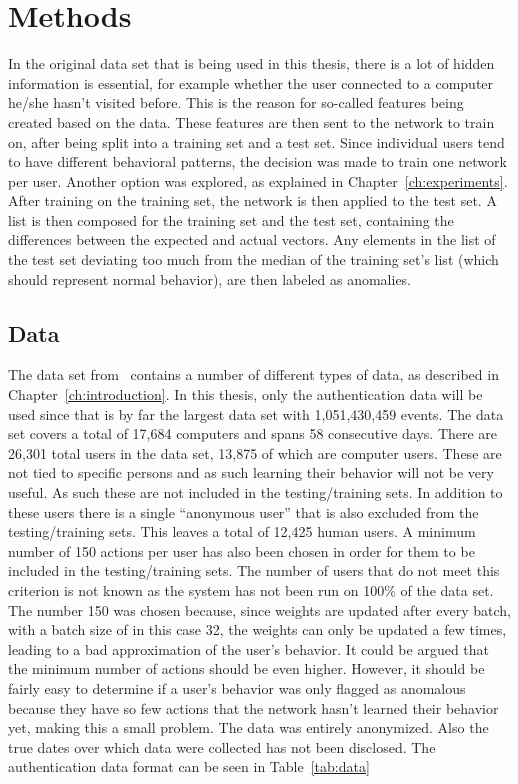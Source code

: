 \chapter{Methods}\label{ch:methods}

In the original data set that is being used in this thesis, there is a lot of hidden information is essential, for example whether the user connected to a computer he/she hasn't visited before. This is the reason for so-called features being created based on the data. These features are then sent to the network to train on, after being split into a training set and a test set. Since individual users tend to have different behavioral patterns, the decision was made to train one network per user. Another option was explored, as explained in Chapter~\ref{ch:experiments}. After training on the training set, the network is then applied to the test set. A list is then composed for the training set and the test set, containing the differences between the expected and actual vectors. Any elements in the list of the test set deviating too much from the median of the training set's list (which should represent normal behavior), are then labeled as anomalies.

\section{Data}
The data set from~\cite{akent-2015-enterprise-data} contains a number of different types of data, as described in Chapter~\ref{ch:introduction}. In this thesis, only the authentication data will be used since that is by far the largest data set with 1,051,430,459 events. The data set covers a total of 17,684 computers and spans 58 consecutive days. There are 26,301 total users in the data set, 13,875 of which are computer users. These are not tied to specific persons and as such learning their behavior will not be very useful. As such these are not included in the testing/training sets. In addition to these users there is a single \enquote{anonymous user} that is also excluded from the testing/training sets. This leaves a total of 12,425 human users. A minimum number of 150 actions per user has also been chosen in order for them to be included in the testing/training sets. The number of users that do not meet this criterion is not known as the system has not been run on 100\% of the data set. The number 150 was chosen because, since weights are updated after every batch, with a batch size of in this case 32, the weights can only be updated a few times, leading to a bad approximation of the user's behavior. It could be argued that the minimum number of actions should be even higher. However, it should be fairly easy to determine if a user's behavior was only flagged as anomalous because they have so few actions that the network hasn't learned their behavior yet, making this a small problem. The data was entirely anonymized. Also the true dates over which data were collected has not been disclosed. The authentication data format can be seen in Table~\ref{tab:data}

